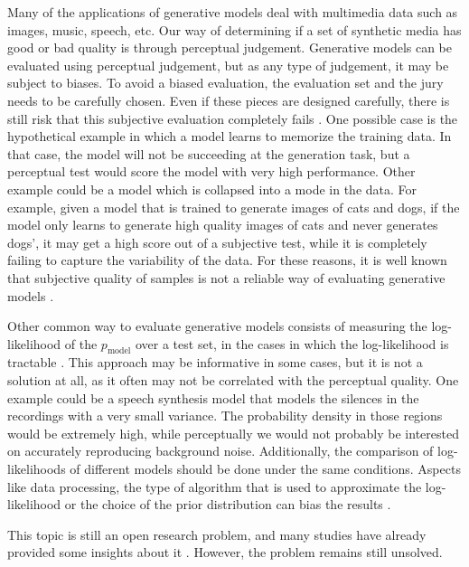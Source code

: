 Many of the applications of generative models deal with multimedia data such as images, music, speech, etc. Our way of determining if a set of synthetic media has good or bad quality is through perceptual judgement. Generative models can be evaluated using perceptual judgement, but as any type of judgement, it may be subject to biases. To avoid a biased evaluation, the evaluation set and the jury needs to be carefully chosen. Even if these pieces are designed carefully, there is still risk that this subjective evaluation completely fails \autocite{Goodfellow2016}. One possible case is the hypothetical example in which a model learns to memorize the training data. In that case, the model will not be succeeding at the generation task, but a perceptual test would score the model with very high performance. Other example could be a model which is collapsed into a mode in the data. For example, given a model that is trained to generate images of cats and dogs, if the model only learns to generate high quality images of cats and never generates dogs', it may get a high score out of a subjective test, while it is completely failing to capture the variability of the data. For these reasons, it is well known that subjective quality of samples is not a reliable way of evaluating generative models \autocite{denton2015}.

Other common way to evaluate generative models consists of measuring the log-likelihood of the $p_\mathrm{model}$ over a test set, in the cases in which the log-likelihood is tractable \autocite{Goodfellow2016}. This approach may be informative in some cases, but it is not a solution at all, as it often may not be correlated with the perceptual quality. One example could be a speech synthesis model that models the silences in the recordings with a very small variance. The probability density in those regions would be extremely high, while perceptually we would not probably be interested on accurately reproducing background noise. Additionally, the comparison of log-likelihoods of different models should be done under the same conditions. Aspects like data processing, the type of algorithm that is used to approximate the log-likelihood or the choice of the prior distribution can bias the results \autocite{Goodfellow2016}.

This topic is still an open research problem, and many studies have already provided some insights about it \autocite{theis2016a, sajjadi2018}. However, the problem remains still unsolved.



